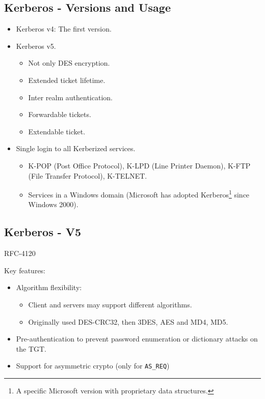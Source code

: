 \subsection*{Kerberos - Versions and Usage}
\begin{itemize}
    \item Kerberos v4: The first version.
    \item Kerberos v5.
    \begin{itemize}
        \item Not only DES encryption.
        \item Extended ticket lifetime.
        \item Inter realm authentication.
        \item Forwardable tickets.
        \item Extendable ticket.
    \end{itemize}
    \item Single login to all Kerberized services.
    \begin{itemize}
        \item K-POP (Post Office Protocol), K-LPD (Line Printer Daemon), K-FTP (File Transfer Protocol), K-TELNET.
        \item Services in a Windows domain (Microsoft has adopted Kerberos\footnote{A specific Microsoft version with proprietary data structures.} since Windows 2000).    \end{itemize}
\end{itemize}

\subsection{Kerberos - V5}
\begin{center}
    RFC-4120
\end{center}
Key features:
\begin{itemize}
    \item Algorithm flexibility:
    \begin{itemize}
        \item Client and servers may support different algorithms.
        \item Originally used DES-CRC32, then 3DES, AES and MD4, MD5.
    \end{itemize}
    \item Pre-authentication to prevent password enumeration or dictionary attacks on the TGT.
    \item Support for asymmetric crypto (only for \texttt{AS\_REQ})
\end{itemize}

